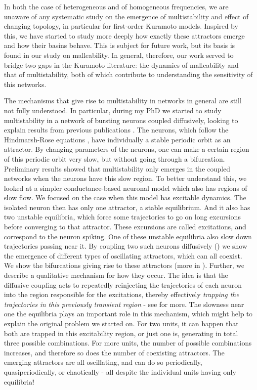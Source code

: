 In both the case of heterogeneous and of homogeneous frequencies, we are unaware of any systematic study on the emergence of multistability and effect of changing topology, in particular for first-order Kuramoto models. Inspired by this, we have started to study more deeply how exactly these attractors emerge and how their basins behave. This is subject for future work, but its basis is found in our study on malleability. In general, therefore, our work served to bridge two gaps in the Kuramoto literature: the dynamics of malleability and that of multistability, both of which contribute to understanding the sensitivity of this networks. 

The mechanisms that give rise to multistability in networks in general are still not fully understood. In particular, during my PhD we started to study multistability in a network of bursting neurons coupled diffusively, looking to explain results from previous publications \cite{rossi2021phase}. The neurons, which follow the Hindmarsh-Rose equations \cite{hindmarsh1984a}, have individually a stable periodic orbit as an attractor. By changing parameters of the neurons, one can make a certain region of this periodic orbit very slow, but without going through a bifurcation. Preliminary results showed that multistability only emerges in the coupled networks when the neurons have this slow region. To better understand this, we looked at a simpler conductance-based neuronal model \cite{izhikevichbook} which also has regions of slow flow. We focused on the case when this model has excitable dynamics. The isolated neuron then has only one attractor, a stable equilibrium. And it also has two unstable equilibria, which force some trajectories to go on long excursions before converging to that attractor. These excursions are called excitations, and correspond to the neuron spiking. One of these unstable equilibria also slow down trajectories passing near it. By coupling two such neurons diffusively () we show the emergence of different types of oscillating attractors, which can all coexist. We show the bifurcations giving rise to these attractors (more in ). Further, we describe a qualitative mechanism for how they occur. The idea is that the diffusive coupling acts to repeatedly reinjecting the trajectories of each neuron into the region responsible for the excitations, thereby effectively \textit{trapping the trajectories in this previously transient region} - see  for more. The slowness near one the equilibria plays an important role in this mechanism, which might help to explain the original problem we started on. For two units, it can happen that both are trapped in this excitability region, or just one is, generating in total three possible combinations. For more units, the number of possible combinations increases, and therefore so does the number of coexisting attractors. The emerging attractors are all oscillating, and can do so periodically, quasiperiodically, or chaotically - all despite the individual units having only equilibria!  
